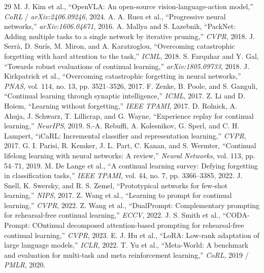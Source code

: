 \documentclass[10pt,twocolumn]{article}
\begin{document}
{\small
\begin{thebibliography}{29}
 M. J. Kim et al., ``OpenVLA: An open-source vision-language-action model,'' \textit{CoRL} / \textit{arXiv:2406.09246}, 2024.
 A. A. Rusu et al., ``Progressive neural networks,'' \textit{arXiv:1606.04671}, 2016.
 A. Mallya and S. Lazebnik, ``PackNet: Adding multiple tasks to a single network by iterative pruning,'' \textit{CVPR}, 2018.
 J. Serr\`{a}, D. Sur\'{i}s, M. Miron, and A. Karatzoglou, ``Overcoming catastrophic forgetting with hard attention to the task,'' \textit{ICML}, 2018.
 S. Farquhar and Y. Gal, ``Towards robust evaluations of continual learning,'' \textit{arXiv:1805.09733}, 2018.
 J. Kirkpatrick et al., ``Overcoming catastrophic forgetting in neural networks,'' \textit{PNAS}, vol. 114, no. 13, pp. 3521--3526, 2017.
 F. Zenke, B. Poole, and S. Ganguli, ``Continual learning through synaptic intelligence,'' \textit{ICML}, 2017.
 Z. Li and D. Hoiem, ``Learning without forgetting,'' \textit{IEEE TPAMI}, 2017.
 D. Rolnick, A. Ahuja, J. Schwarz, T. Lillicrap, and G. Wayne, ``Experience replay for continual learning,'' \textit{NeurIPS}, 2019.
 S.-A. Rebuffi, A. Kolesnikov, G. Sperl, and C. H. Lampert, ``iCaRL: Incremental classifier and representation learning,'' \textit{CVPR}, 2017.
 G. I. Parisi, R. Kemker, J. L. Part, C. Kanan, and S. Wermter, ``Continual lifelong learning with neural networks: A review,'' \textit{Neural Networks}, vol. 113, pp. 54--71, 2019.
 M. De Lange et al., ``A continual learning survey: Defying forgetting in classification tasks,'' \textit{IEEE TPAMI}, vol. 44, no. 7, pp. 3366--3385, 2022.
 J. Snell, K. Swersky, and R. S. Zemel, ``Prototypical networks for few-shot learning,'' \textit{NIPS}, 2017.
 Z. Wang et al., ``Learning to prompt for continual learning,'' \textit{CVPR}, 2022.
 Z. Wang et al., ``DualPrompt: Complementary prompting for rehearsal-free continual learning,'' \textit{ECCV}, 2022.
 J. S. Smith et al., ``CODA-Prompt: COntinual decomposed attention-based prompting for rehearsal-free continual learning,'' \textit{CVPR}, 2023.
 E. J. Hu et al., ``LoRA: Low-rank adaptation of large language models,'' \textit{ICLR}, 2022.
 T. Yu et al., ``Meta-World: A benchmark and evaluation for multi-task and meta reinforcement learning,'' \textit{CoRL}, 2019 / \textit{PMLR}, 2020.

\end{thebibliography}}
\end{document}
